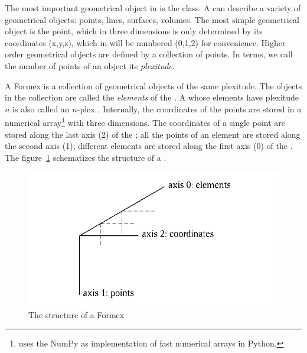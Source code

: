 The most important geometrical object in \pyf is the  class. A  can describe a variety of geometrical objects: points, lines, surfaces, volumes. The most simple geometrical object is the point, which in three dimensions is only determined by its coordinates \code(x,y,z), which in \pyf will be numbered \code(0,1,2) for convenience. Higher order geometrical objects are defined by a collection of points. In \pyf terms, we call the number of points of an object its \emph{plexitude}. 

A Formex is a collection of geometrical objects of the same plexitude. The objects in the collection are called the \emph{elements} of the . A  whose elements have plexitude $n$ is also called an $n$-plex . Internally, the coordinates of the points are stored in a numerical array\footnote{\pyf uses the NumPy  as implementation of fast numerical arrays in Python.} with three dimensions. The coordinates of a single point are stored along the last axis (2) of the ; all the points of an element are stored along the second axis (1); different elements are stored along the first axis (0) of the . The figure~\ref{fig:formex} schematizes the structure of a . 

\begin{figure}[ht]
  \centering
  \begin{makeimage}
  \end{makeimage}
  \begin{latexonly}
    \includegraphics{images/Formex}
  \end{latexonly}
  \begin{htmlonly}
  \end{htmlonly}  
  \caption{The structure of a Formex}
  \label{fig:formex}
\end{figure}

